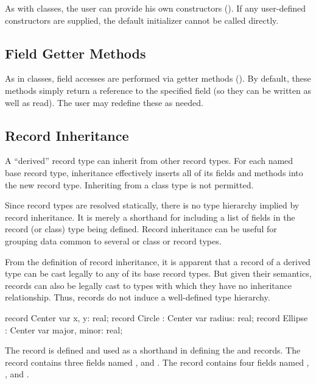 As with classes, the user can provide his own constructors
().  If any user-defined constructors are
supplied, the default initializer cannot be called directly.  

\subsection{Field Getter Methods}
\label{Field_Getter_Methods}

As in classes, field accesses are performed via getter methods
().  By default, these methods simply return a reference to
the specified field (so they can be written as well as read).  The user may
redefine these as needed.

\subsection{Record Inheritance}
\label{Record_Inheritance}

A ``derived'' record type can inherit from other record types.  For each named
base record type, inheritance effectively inserts all of its fields and methods
into the new record type.  Inheriting from a class type is not permitted.

Since record types are resolved statically, there is no type hierarchy implied
by record inheritance.  It is merely a shorthand for including a list of fields
in the record (or class) type being defined.  Record inheritance can be useful
for grouping data common to several or class or record types.

From the definition of record inheritance, it is apparent that a record of a
derived type can be cast legally to any of its base record types.  But given
their semantics, records can also be legally cast to types with which they have
no inheritance relationship.  Thus, records do not induce a well-defined type
hierarchy.

\begin{example}
\begin{chapelpre}
\end{chapelpre}
\begin{chapel}
record Center { var x, y: real; }
record Circle : Center {
  var radius: real;
}
record Ellipse : Center {
  var major, minor: real;
}
\end{chapel}
\begin{chapeloutput}
\end{chapeloutput}
The record  is defined and used as a shorthand in defining
the  and  records.  The  record contains
three  fields named ,  and .  The
 record contains four  fields named , ,
 and .
\end{example}

